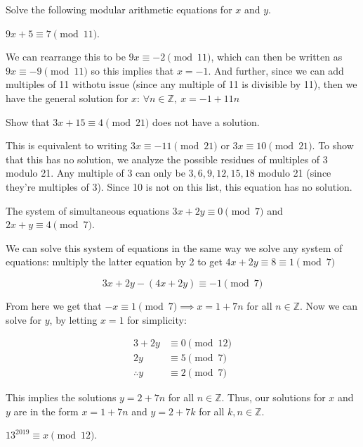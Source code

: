 \documentclass[11pt]{article}
\begin{document}
Solve the following modular arithmetic equations for $x$ and $y$.
\begin{Parts}
\Part $9x+5 \equiv 7 \pmod{11}$.

\begin{solution} 
  We can rearrange this to be $9x \equiv -2 \pmod{11}$, which can then be written as $9x \equiv -9 \pmod{11}$ so this implies that $x = -1$. And further, since we can add multiples of 11 withotu issue (since any multiple of 11 is divisible by 11), then we have the general solution for $x$: $\forall n \in \mathbb Z, \  x = -1 + 11n$
\end{solution}

\Part Show that $3x+15 \equiv 4 \pmod{21}$ does not have a solution.

\begin{solution}
  This is equivalent to writing $3x \equiv -11 \pmod{21}$ or $3x \equiv 10 \pmod{21}$. To show that this has no solution, we analyze the possible residues of multiples of 3 modulo 21. Any multiple of 3 can only be $3, 6, 9, 12, 15, 18$ modulo 21 (since they're multiples of 3). Since 10 is not on this list, this equation has no solution.
\end{solution}

\Part The system of simultaneous equations
$3x+2y \equiv 0 \pmod{7}$ and $2x+y \equiv 4 \pmod{7}$.

\begin{solution}
  We can solve this system of equations in the same way we solve any system of equations: multiply the latter equation by 2 to get $4x + 2y \equiv 8 \equiv 1 \pmod 7$

  \[ 3x + 2y - (4x + 2y) \equiv -1 \pmod{7}\] 

  From here we get that $-x \equiv 1 \pmod 7 \implies x = 1 + 7n$ for all $n \in \mathbb Z$. Now we can solve for $y$, by letting $x =1$ for simplicity: 

  \begin{align*}
    3 + 2y &\equiv 0 \pmod{12}\\
    2y &\equiv 5 \pmod 7\\
    \therefore y &\equiv 2 \pmod {7}
  \end{align*}

  This implies the solutions $y = 2 + 7n$ for all $n \in \mathbb Z$. Thus, our solutions for $x$ and $y$ are in the form $x = 1 + 7n$ and $y = 2 + 7k$ for all $k, n \in \mathbb Z$.
\end{solution}

\Part $13^{2019} \equiv x \pmod{12}$.



\end{Parts}
\end{document}
